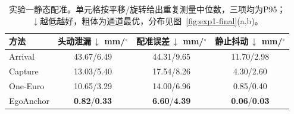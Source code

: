 \begin{table}[t]
\centering
\caption{实验一静态配准。单元格按平移/旋转给出重复测量中位数，三项均为P95；$\downarrow$越低越好，粗体为通道最优，分布见图~\ref{fig:exp1-final}(a,b)。}
\label{tab:exp1-static}
\begin{tabular}{@{}lccc@{}}
\toprule
方法 & \shortstack{头动泄漏\,$\downarrow$\\mm/$^\circ$} & \shortstack{配准误差\,$\downarrow$\\mm/$^\circ$} & \shortstack{静止抖动\,$\downarrow$\\mm/$^\circ$} \\
\midrule
Arrival & 43.67/6.49 & 44.31/9.65 & 11.70/2.98 \\
Capture & 13.03/5.40 & 17.54/8.26 & 4.30/2.60 \\
One-Euro & 10.65/3.29 & 14.00/6.96 & 0.85/0.40 \\
EgoAnchor & \textbf{0.82}/\textbf{0.33} & \textbf{6.60}/\textbf{4.39} & \textbf{0.06}/\textbf{0.03} \\
\bottomrule
\end{tabular}
\end{table}

